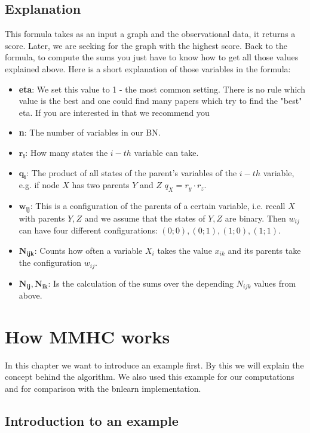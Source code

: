 	\section*{Explanation}

		This formula takes as an input a graph and the observational data, it returns a score. Later, we are seeking for the graph with the highest score. Back to the formula, to compute the sums you just have to know how to get all those values explained above. Here is a short explanation of those variables in the formula:

		\begin{itemize}
			\item \textbf{eta}: We set this value to 1 - the most common setting. There is no rule which value is the best and one could find many papers which try to find the "best" eta. If you are interested in that we recommend you \cite{SKM}
			\item \textbf{n}: The number of variables in our BN.
			\item $\boldsymbol{r_{i}}$: How many states the $i-th$ variable can take.
			\item $\boldsymbol{q_{i}}$: The product of all states of the parent's variables of the $i-th$ variable, e.g. if node $X$ has two parents $Y$ and $Z$ $q_{X} = r_{y} \cdot r_{z}$.
			\item $\boldsymbol{w_{ij}}$: This is a configuration of the parents of a certain variable, i.e. recall $X$ with parents $Y, Z$ and we assume that the states of $Y, Z$ are binary. Then $w_{ij}$ can have four different configurations: $(0; 0), (0; 1), (1; 0), (1; 1)$.
			\item $\boldsymbol{N_{ijk}}$: Counts how often a variable $X_{i}$ takes the value $x_{ik}$ and its parents take the configuration $w_{ij}$.
			\item $\boldsymbol{N_{ij}, N_{ik}}$: Is the calculation of the sums over the depending $N_{ijk}$ values from above.
		\end{itemize}

\chapter{How MMHC works}

	In this chapter we want to introduce an example first. By this we will explain the concept behind the algorithm. We also used this example for our computations and for comparison with the bnlearn implementation.

	\section{Introduction to an example} \label{s.example}

